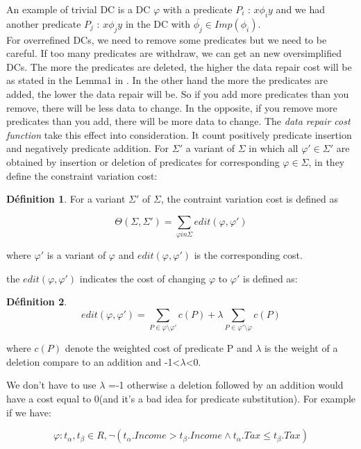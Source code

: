 \documentclass[letterpaper, 12pt]{report}
\theoremstyle{definition}
\newtheorem{mydef}{Définition}
\begin{document}
An example of trivial DC is a DC $\varphi$ with a predicate $P_i$ : $x \phi_i y$ and we had another predicate $P_j$ : $x \phi_j y$ in the DC with $\overline{\phi_j} \in Imp(\phi_i)$. \\

For overrefined DCs, we need to remove some predicates but we need to be careful. If too many predicates are withdraw, we can get an new oversimplified DCs. The more the predicates are deleted, the higher the data repair cost will be as stated in the Lemma1 in \cite{main}. In the other hand the more the predicates are added, the lower the data repair will be. So if you add more predicates than you remove, there will be less data to change. In the opposite, if you remove more predicates than you add, there will be more data to change. The \emph{data repair cost function} take this effect into consideration. It count positively predicate insertion and negatively predicate addition. For $\Sigma '$ a variant of $\Sigma$ in which all $\varphi ' \in \Sigma '$ are obtained by insertion or deletion of predicates for corresponding $\varphi \in \Sigma$, in \cite{main} they define the constraint variation cost:

\begin{mydef}
For a variant $\Sigma '$ of $\Sigma$, the contraint variation cost is defined as

$$\Theta (\Sigma,\Sigma ') = \sum_{\varphi in \Sigma} edit(\varphi,\varphi ')$$

\hspace*{2cm} where $\varphi '$ is a variant of $\varphi$ and $edit(\varphi,\varphi ')$ is the corresponding cost.
\end{mydef}

the $edit(\varphi , \varphi ')$ indicates the cost of changing $\varphi$ to $\varphi'$ is defined as:
\begin{mydef}
$$
 edit(\varphi, \varphi') = \sum_{P \in \varphi \setminus \varphi'} c(P) + \lambda \sum_{P \in \varphi' \setminus \varphi} c(P)$$
 
where $c(P)$ denote the weighted cost of predicate P and $\lambda$ is the weight of a deletion compare to an addition and -1<$\lambda$<0.
\end{mydef}

We don't have to use $\lambda$ =-1 otherwise a deletion followed by an addition would have a cost equal to 0(and it's a bad idea for predicate substitution). For example if we have:

$$ \varphi : t_\alpha,t_\beta \in R, \neg(t_\alpha.Income > t_\beta.Income \wedge t_\alpha.Tax \leq t_\beta.Tax)$$
\end{document}

